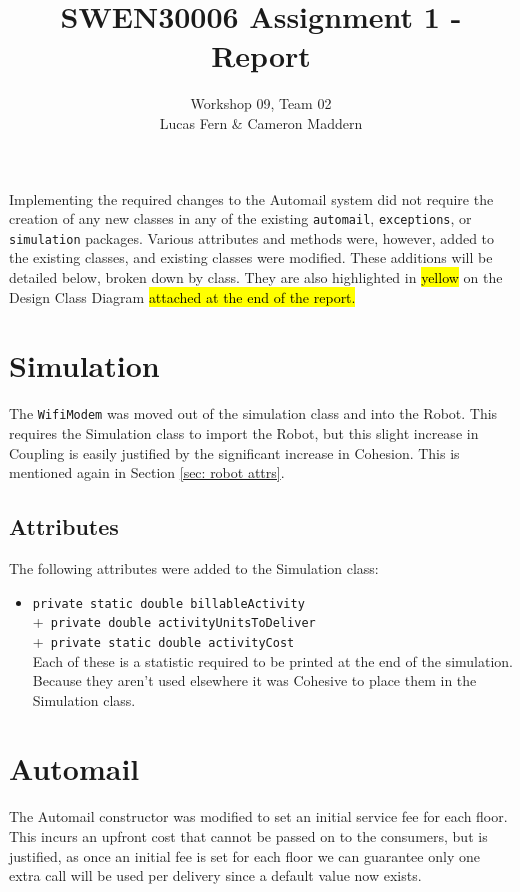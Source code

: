\documentclass{article}
\title{\vspace{-1.5cm}SWEN30006 Assignment 1 - Report}
\date{}
\author{Workshop 09, Team 02\\Lucas Fern \& Cameron Maddern}
\begin{document}
\maketitle
\noindent Implementing the required changes to the Automail system did not require the creation of any new classes in any of the existing \verb|automail|, \verb|exceptions|, or \verb|simulation| packages. Various attributes and methods were, however, added to the existing classes, and existing classes were modified. These additions will be detailed below, broken down by class. They are also highlighted in \hl{yellow} on the Design Class Diagram \hl{attached at the end of the report.}

\section{Simulation}
The \verb|WifiModem| was moved out of the simulation class and into the Robot. This requires the Simulation class to import the Robot, but this slight increase in Coupling is easily justified by the significant increase in Cohesion. This is mentioned again in Section \ref{sec: robot attrs}. 
\subsection{Attributes}
The following attributes were added to the Simulation class:
\begin{itemize}
    \item \verb|private static double billableActivity|\\
         +\verb| private double activityUnitsToDeliver|\\
         +\verb| private static double activityCost|\\[2mm]
    Each of these is a statistic required to be printed at the end of the simulation. Because they aren't used elsewhere it was Cohesive to place them in the Simulation class.
\end{itemize}

\section{Automail}
The Automail constructor was modified to set an initial service fee for each floor. This incurs an upfront cost that cannot be passed on to the consumers, but is justified, as once an initial fee is set for each floor we can guarantee only one extra call will be used per delivery since a default value now exists.
\end{document}
